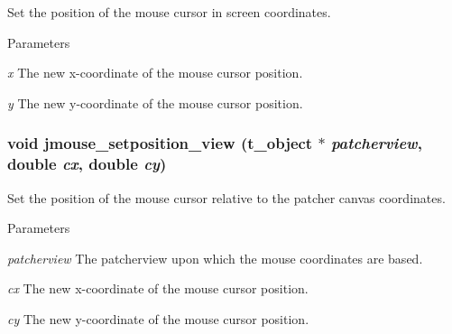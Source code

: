 Set the position of the mouse cursor in screen coordinates. 
\begin{DoxyParams}{Parameters}
\item[{\em x}]The new x-\/coordinate of the mouse cursor position. \item[{\em y}]The new y-\/coordinate of the mouse cursor position. \end{DoxyParams}
\hypertarget{group__jmouse_ga030290f12df92eb02c507ed271ffcde9}{
\subsubsection[{jmouse\_\-setposition\_\-view}]{\setlength{\rightskip}{0pt plus 5cm}void jmouse\_\-setposition\_\-view ({\bf t\_\-object} $\ast$ {\em patcherview}, \/  double {\em cx}, \/  double {\em cy})}}
\label{group__jmouse_ga030290f12df92eb02c507ed271ffcde9}


Set the position of the mouse cursor relative to the patcher canvas coordinates. 
\begin{DoxyParams}{Parameters}
\item[{\em patcherview}]The patcherview upon which the mouse coordinates are based. \item[{\em cx}]The new x-\/coordinate of the mouse cursor position. \item[{\em cy}]The new y-\/coordinate of the mouse cursor position. \end{DoxyParams}
